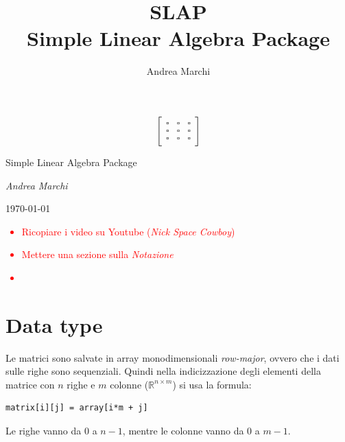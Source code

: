 \documentclass[10pt]{article}
\begin{document}
\title{\textbf{SLAP}\\ Simple Linear Algebra Package}
\author{Andrea Marchi}

\begin{titlepage}
\centering
\begin{equation*}
\begin{bmatrix}
\square & \square & \square \\
\square & \square & \square \\
\square & \square & \square
\end{bmatrix}
\end{equation*}

\vspace{2cm}

\begin{Huge}
\end{Huge}

\bigskip

\begin{LARGE}
Simple Linear Algebra Package
\end{LARGE}
\vspace{1cm}

\begin{Large}
\textit{Andrea Marchi}
\end{Large}

\today

\vfill
\end{titlepage}

\tableofcontents


\textcolor{red}{\begin{itemize}
\Large
\item Ricopiare i video su Youtube (\textit{Nick Space Cowboy})
\item Mettere una sezione sulla \textit{Notazione}
\item 
\end{itemize}}


\section{Data type}

Le matrici sono salvate in array monodimensionali \textit{row-major}, ovvero che i dati sulle righe sono sequenziali. Quindi nella indicizzazione degli elementi della matrice con $n$ righe e $m$ colonne ($\mathbb{R}^{n\times m}$) si usa la formula:
\begin{lstlisting}
matrix[i][j] = array[i*m + j]
\end{lstlisting}
Le righe vanno da $0$ a $n-1$, mentre le colonne vanno da $0$ a $m-1$.
\end{document}
